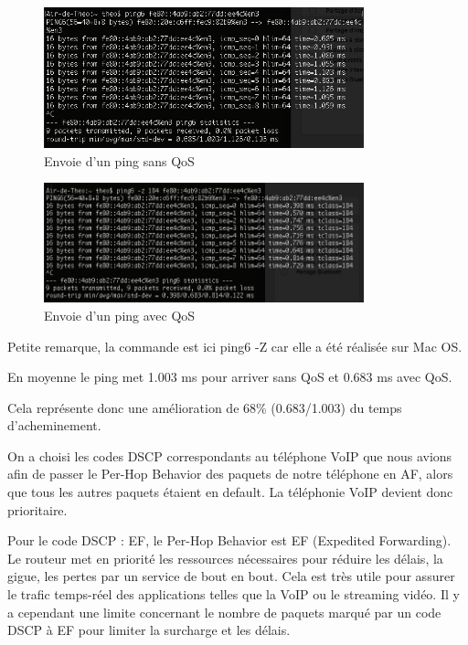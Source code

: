         \begin{figure}[h]
        \includegraphics[width=350px]{figures/ping_sans_qos.png}
        \centering
        \caption{Envoie d'un ping sans QoS}
        \end{figure}
        
        \begin{figure}[h]
        \includegraphics[width=350px]{figures/ping_qos.png}
        \centering
        \caption{Envoie d'un ping avec QoS}
        \end{figure}
        
    Petite remarque, la commande est ici ping6 -Z car elle a été réalisée sur Mac OS.
    
    En moyenne le ping met 1.003 ms pour arriver sans QoS et 0.683 ms avec QoS.
    
    Cela représente donc une amélioration de 68\% (0.683/1.003) du temps d'acheminement.
      
    On a choisi les codes DSCP correspondants au téléphone VoIP que nous avions afin de passer le Per-Hop Behavior des paquets de notre téléphone en AF, alors que tous les autres paquets étaient en default. La téléphonie VoIP devient donc prioritaire.
    
    Pour le code DSCP : EF, le Per-Hop Behavior est EF (Expedited Forwarding).
    Le routeur met en priorité les ressources nécessaires pour réduire les délais, la gigue, les pertes par un service de bout en bout. Cela est très utile pour assurer le trafic temps-réel des applications telles que la VoIP ou le streaming vidéo. Il y a cependant une limite concernant le nombre de paquets marqué par un code DSCP à EF pour limiter la surcharge et les délais.
    
